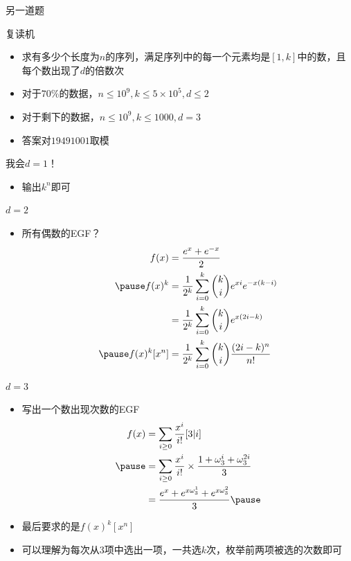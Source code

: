 \documentclass{beamer}
\begin{document}
\begin{frame}{另一道题}
    \begin{block}{复读机}
        \begin{itemize}
            \item 求有多少个长度为$n$的序列，满足序列中的每一个元素均是$[1, k]$中的数，且每个数出现了$d$的倍数次
            \item 对于$70\%$的数据，$n\leq 10^9, k\leq 5\times 10^5, d\leq 2$
            \item 对于剩下的数据，$n\leq 10^9, k\leq 1000, d = 3$
            \item 答案对$19491001$取模
        \end{itemize}
    \end{block}
\end{frame}

\begin{frame}{我会$d = 1$！}
    \begin{itemize}
        \item 输出$k^n$即可
    \end{itemize}
\end{frame}

\begin{frame}{$d = 2$}
    \begin{itemize}
        \item 所有偶数的EGF？\pause
        $$\begin{aligned}
            f(x) &= \frac{e^x + e^{-x}}{2}\\ \pause
            f(x)^k &= \frac{1}{2^k} \sum_{i = 0}^k {k\choose i} e^{xi} e^{-x(k - i)}\\
            &= \frac{1}{2^k} \sum_{i = 0}^k {k\choose i} e^{x(2i - k)}\\ \pause
            f(x)^k[x^n] &= \frac{1}{2^k} \sum_{i = 0}^k {k\choose i}\frac{(2i - k)^n}{n!}
        \end{aligned}$$
    \end{itemize}
\end{frame}

\begin{frame}{$d = 3$}
    \begin{itemize}
        \item 写出一个数出现次数的EGF\pause
        $$\begin{aligned}
            f(x) &= \sum_{i \geq 0} \frac{x^i}{i!} [3|i]\\ \pause
            &= \sum_{i \geq 0} \frac{x^i}{i!} \times \frac{1 + \omega_3^i + \omega_3^{2i}}{3}\\ 
            &= \frac{e^x + e^{x\omega_3^1} + e^{x\omega_3^2}}{3} \pause
        \end{aligned}$$
        \item 最后要求的是$f(x)^k[x^n]$ \pause
        \item 可以理解为每次从$3$项中选出一项，一共选$k$次，枚举前两项被选的次数即可
    \end{itemize}
\end{frame}
\end{document}
